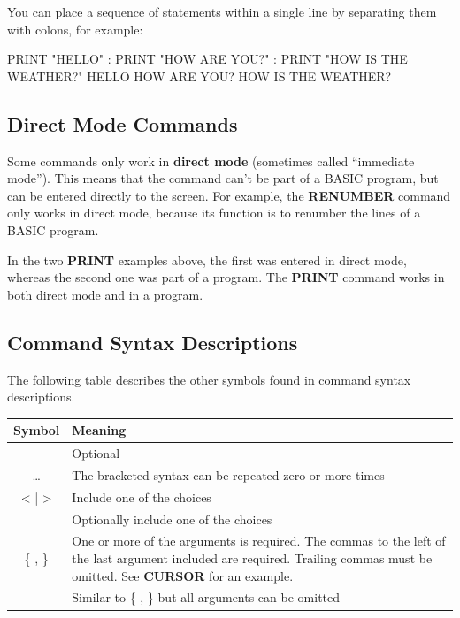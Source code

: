 You can place a sequence of statements within a single line by separating them with colons, for example:

\begin{screencode}
PRINT "HELLO" : PRINT "HOW ARE YOU?" : PRINT "HOW IS THE WEATHER?"
HELLO
HOW ARE YOU?
HOW IS THE WEATHER?
\end{screencode}

\subsection{Direct Mode Commands}
Some commands only work in {\bf direct mode} (sometimes called ``immediate
mode''). This means that the command can't be part of a BASIC program, but
can be entered directly to the screen. For example, the {\bf RENUMBER}
command only works in direct mode, because its function is to renumber the
lines of a BASIC program.

In the two {\bf PRINT} examples above, the first was entered in direct mode,
whereas the second one was part of a program. The {\bf PRINT} command works
in both direct mode and in a program.

\subsection{Command Syntax Descriptions}
The following table describes the other symbols found in command syntax
descriptions.

\begin{center}
    \begin{longtable}{|c|L{8cm}|}
        \hline
        \textbf{Symbol} & \textbf{Meaning}\\
        \hline
        \endhead
        [ ] &
        Optional \\
        \hline
        \dots &
        The bracketed syntax can be repeated zero or more times \\
        \hline
        < | > &
        Include one of the choices \\
        \hline
        [ | ] &
        Optionally include one of the choices \\
        \hline
        \{ , \} &
        One or more of the arguments is required. The commas to the left of the last
        argument included are required. Trailing commas must be omitted. See
        {\bf CURSOR} for an example.\\
        \hline
        [\{ , \}] &
        Similar to \{ , \} but all arguments can be omitted\\
        \hline

    \end{longtable}
\end{center}

